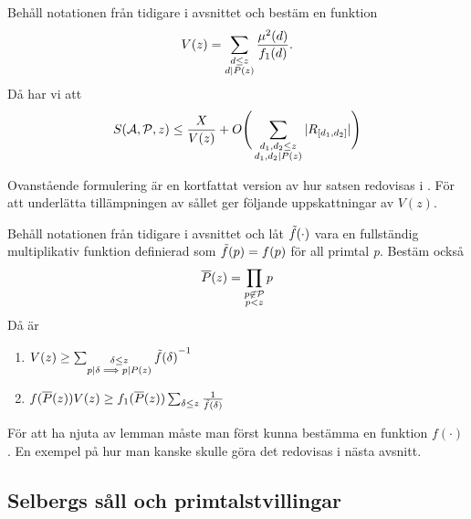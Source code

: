 \begin{theorem}\label{thm:SelbergSieve} Behåll notationen från tidigare i avsnittet och bestäm en funktion
\begin{equation}
    V(z) = \sum_{\substack{d\leq z\\ d\divides P(z)}}\frac{\mu^2(d)}{f_1(d)}.\nonumber
\end{equation}
Då har vi att
\begin{equation}
    \S{A}{P}{z} \leq \frac{X}{V(z)} + O\Bigg(\sum_{\substack{d_1,d_2\leq z\\d_1,d_2\divides P(z)}}|R_{[d_1, d_2]}|\Bigg)\nonumber
\end{equation}
\end{theorem}
Ovanstående formulering är en kortfattat version av hur satsen redovisas i \cite{cojocarumurty}. För att underlätta tillämpningen av sållet ger \cite{cojocarumurty} följande uppskattningar av \(V(z)\).
\begin{lemma}[Uppskattningar av \(V(z)\)]\label{thm:SelVApp}
Behåll notationen från tidigare i avsnittet och låt \(\Tilde{f}(\cdot)\) vara en fullständig multiplikativ funktion definierad som \(\Tilde{f}(p) = f(p)\) för all primtal \textit{p}. Bestäm också
\begin{equation}
    \overline{P}(z) = \prod_{\substack{p\not\in\P\\p<z}} p\nonumber
\end{equation}
Då är
\begin{enumerate}
    \item \(
         V(z) \geq \sum_{\substack{\delta\leq z\\p\divides\delta\implies p\divides P(z)}} {\Tilde{f}(\delta)}^{-1}\nonumber\)
    \item \(
        f(\overline{P}(z))V(z) \geq f_1(\overline{P}(z))\sum_{\delta \leq z}\frac{1}{\Tilde{f}(\delta)}\nonumber
    \)
\end{enumerate}
\end{lemma}
För att ha njuta av lemman måste man först kunna bestämma en funktion \(f(\cdot)\). En exempel på hur man kanske skulle göra det redovisas i nästa avsnitt.
\subsection{Selbergs såll och primtalstvillingar}